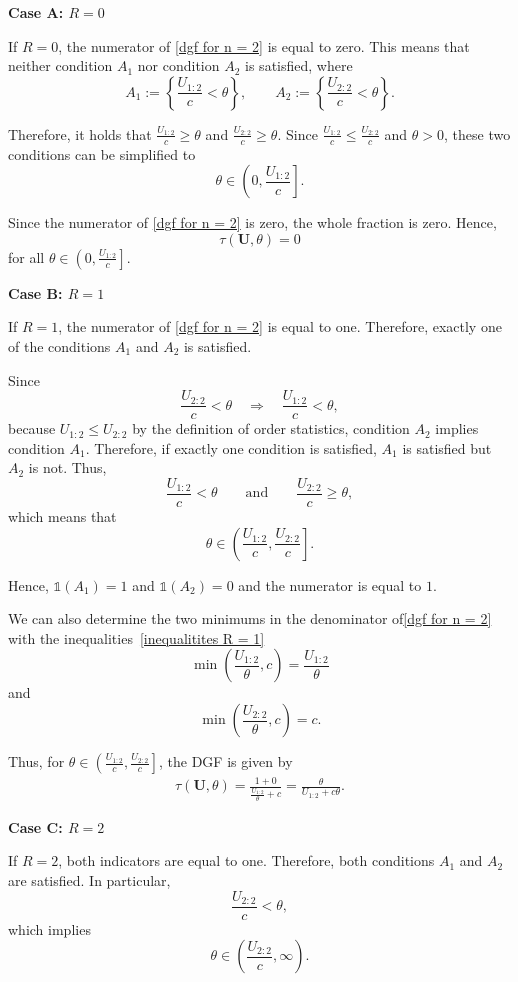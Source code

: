 \textbf{Case A: $R = 0$}

If $R=0$, the numerator of \eqref{dgf for n = 2} is equal to zero. This means that neither condition $A_1$ nor condition $A_2$ is satisfied, where
\[
A_1 := \left\{\frac{U_{1:2}}{c}<\theta\right\},
\qquad
A_2 := \left\{\frac{U_{2:2}}{c}<\theta\right\}.
\]

Therefore, it holds that 
$\frac{U_{1:2}}{c}\geq\theta$
and
$\frac{U_{2:2}}{c}\geq\theta$.
Since
\(
\frac{U_{1:2}}{c}\leq\frac{U_{2:2}}{c}
\)
and $\theta>0$, these two conditions can be simplified to
\[
\theta\in\left(0,\frac{U_{1:2}}{c}\right].
\]

Since the numerator of \eqref{dgf for n = 2} is zero, the whole fraction is zero. Hence,
\[
\tau(\mathbf U,\theta)=0
\]
for all
$\theta\in\left(0,\frac{U_{1:2}}{c}\right]$.


\textbf{Case B: $R = 1$}

If $R=1$, the numerator of \eqref{dgf for n = 2} is equal to one. Therefore, exactly one of the conditions $A_1$ and $A_2$ is satisfied.

Since
\[
\frac{U_{2:2}}{c}<\theta
\quad\Longrightarrow\quad
\frac{U_{1:2}}{c}<\theta,
\]
because $U_{1:2}\leq U_{2:2}$ by the definition of order statistics, condition $A_2$ implies condition $A_1$. Therefore, if exactly one condition is satisfied, $A_1$ is satisfied but $A_2$ is not. Thus,
\begin{equation} \label{inequalitites R = 1}
	\frac{U_{1:2}}{c}<\theta
	\qquad\text{and}\qquad
	\frac{U_{2:2}}{c}\geq\theta,
\end{equation}
which means that
\[
\theta\in
\left(
\frac{U_{1:2}}{c},
\frac{U_{2:2}}{c}
\right].
\]

Hence,
$\mathds{1}(A_1)=1$
and
$\mathds{1}(A_2)=0$ and the numerator is equal to $1$.

We can also determine the two minimums in the denominator of\eqref{dgf for n = 2} with the inequalities~\eqref{inequalitites R = 1}
\[
\min\left(\frac{U_{1:2}}{\theta},c\right)
=
\frac{U_{1:2}}{\theta}
\]
and
\[
\min\left(\frac{U_{2:2}}{\theta},c\right)
=
c.
\]

Thus, for
$\theta\in
\left(
\frac{U_{1:2}}{c},
\frac{U_{2:2}}{c}
\right]$,
the DGF is given by 
\begin{align}
	\tau(\mathbf U,\theta)
	=
	\frac{1 + 0}{
		\frac{U_{1:2}}{\theta}+c
	}
	=
	\frac{\theta}{U_{1:2}+c\theta}.
\end{align}


\textbf{Case C: $R = 2$}

If $R=2$, both indicators are equal to one. Therefore, both conditions $A_1$ and $A_2$ are satisfied. In particular,
\[
\frac{U_{2:2}}{c}<\theta,
\]
which implies
\[
\theta\in
\left(
\frac{U_{2:2}}{c},
\infty
\right).
\]

